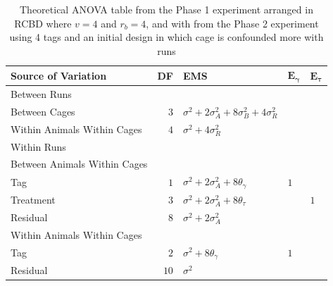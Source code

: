 \documentclass[12pt,a4paper]{article}
\begin{document}
\begin{table}[ht]
\centering
 \caption{Theoretical ANOVA table from the Phase 1 experiment arranged in RCBD where $v = 4$ and $r_b = 4$, and with from the Phase 2 experiment using 4 tags and an initial design in which cage is confounded more with runs}
 \begin{tabular}[t]{lrlll} 
 \toprule 
 \multicolumn{1}{l}{\textbf{Source of Variation}} & \multicolumn{1}{l}{\textbf{DF}} & \multicolumn{1}{l}{\textbf{EMS}}& \multicolumn{1}{l}{$\bm{E_{\gamma}}$}&\multicolumn{1}{l}{$\bm{E_{\tau}}$}\\ 
 \midrule 
 Between Runs &  &  & & \\ 
 \quad Between Cages & $3$ & $\sigma^2+2\sigma_{A}^2+8\sigma_{B}^2+4\sigma_{R}^2$ & & \\  
 \quad Within Animals Within Cages & $4$ & $\sigma^2+4\sigma_{R}^2$ & & \\ \hline 
 Within Runs &  &  & & \\ 
 \quad Between Animals Within Cages &  &  & & \\ 
 \quad \quad Tag & $1$ & $\sigma^2+2\sigma_{A}^2+8\theta_{\gamma}$ &$1$ & \\ 
 \quad \quad Treatment & $3$ & $\sigma^2+2\sigma_{A}^2+8\theta_{\tau}$ & & $1$\\ 
 \quad \quad Residual & $8$ & $\sigma^2+2\sigma_{A}^2$ & & \\ \hline 
 \quad Within Animals Within Cages &  &  & & \\ 
 \quad \quad Tag & $2$ & $\sigma^2+8\theta_{\gamma}$ &$1$ & \\ 
 \quad \quad Residual & $10$ & $\sigma^2$ & & \\ 
 \bottomrule 
 \end{tabular} 
 \label{tab:ANOVAPhase1RCBD1} 
\end{table} 
\end{document}
